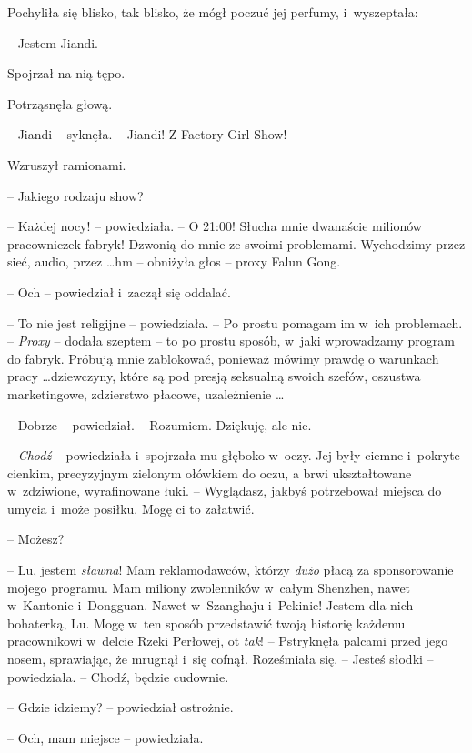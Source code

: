\documentclass[oneside,polish,11pt,rmheadings]{mwbk}
\begin{document}
Pochyliła się blisko, tak blisko, że mógł poczuć jej perfumy, i~wyszeptała: 

-- Jestem Jiandi.

Spojrzał na nią tępo.

Potrząsnęła głową.

-- Jiandi -- syknęła. -- Jiandi! Z Factory Girl Show!

Wzruszył ramionami. 

-- Jakiego rodzaju show? 

-- Każdej nocy! -- powiedziała. -- O 21:00! Słucha mnie dwanaście milionów pracowniczek fabryk! Dzwonią do mnie ze swoimi problemami. Wychodzimy przez sieć, audio, przez \ldots  hm -- obniżyła głos -- proxy Falun Gong.

-- Och -- powiedział i~zaczął się oddalać.

-- To nie jest religijne -- powiedziała. -- Po prostu pomagam im w~ich problemach. -- \textit{Proxy} -- dodała szeptem -- to po prostu sposób, w~jaki wprowadzamy program do fabryk. Próbują mnie zablokować, ponieważ mówimy prawdę o warunkach pracy  \ldots  dziewczyny, które są pod presją seksualną swoich szefów, oszustwa marketingowe, zdzierstwo płacowe, uzależnienie \ldots 

-- Dobrze -- powiedział. -- Rozumiem. Dziękuję, ale nie.

-- \textit{Chodź }-- powiedziała i~spojrzała mu głęboko w~oczy. Jej były ciemne i~pokryte cienkim, precyzyjnym zielonym ołówkiem do oczu, a brwi ukształtowane w~zdziwione, wyrafinowane łuki. -- Wyglądasz, jakbyś potrzebował miejsca do umycia i~może posiłku. Mogę ci to załatwić.

-- Możesz? 

-- Lu, jestem \textit{sławna}! Mam reklamodawców, którzy \textit{dużo }płacą za sponsorowanie mojego programu. Mam miliony zwolenników w~całym Shenzhen, nawet w~Kantonie i~Dongguan. Nawet w~Szanghaju i~Pekinie! Jestem dla nich bohaterką, Lu. Mogę w~ten sposób przedstawić twoją historię każdemu pracownikowi w~delcie Rzeki Perłowej, ot \textit{tak}! -- Pstryknęła palcami przed jego nosem, sprawiając, że mrugnął i~się cofnął. Roześmiała się. -- Jesteś słodki -- powiedziała. -- Chodź, będzie cudownie. 

-- Gdzie idziemy? -- powiedział ostrożnie.

-- Och, mam miejsce -- powiedziała.
\end{document}
